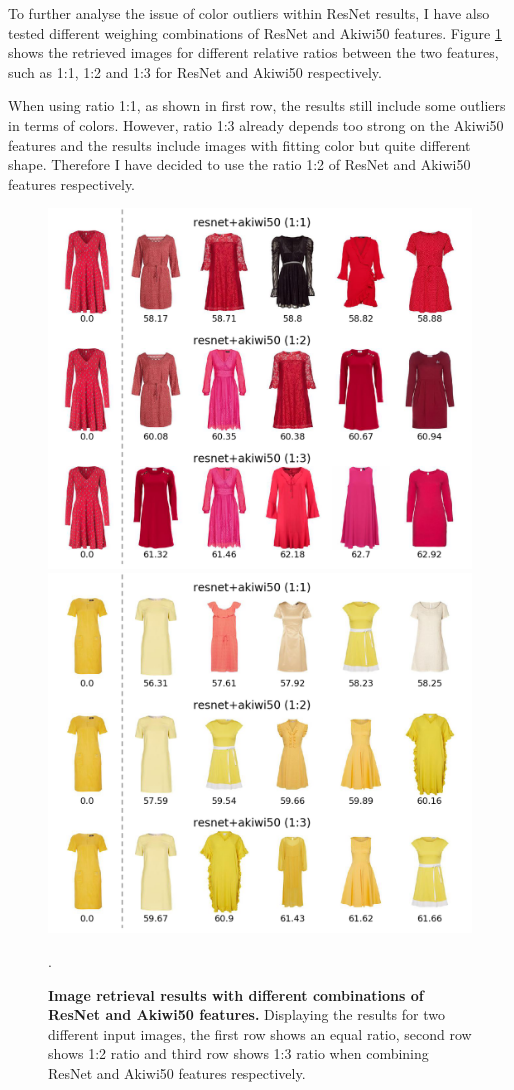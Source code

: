 \documentclass[12pt]{report}
\begin{document}
To further analyse the issue of color outliers within ResNet results, I have also tested different weighing combinations of ResNet and Akiwi50 features. Figure \ref{fig:search_weights} shows the retrieved images for different relative ratios between the two features, such as 1:1, 1:2 and 1:3 for ResNet and Akiwi50 respectively. 

When using ratio 1:1, as shown in first row, the results still include some outliers in terms of colors. However, ratio 1:3 already depends too strong on the Akiwi50 features and the results include images with fitting color but quite different shape. Therefore I have decided to use the ratio 1:2 of ResNet and Akiwi50 features respectively.

\begin{figure}[!h]
\centering
{\includegraphics[width=.48\linewidth]{04_experiments/retrieval/resnet_red}}\hspace{0.2cm}
{\includegraphics[width=.48\linewidth]{04_experiments/retrieval/resnet_yellow}}
\caption{\label{fig:search_weights} \textbf{Image retrieval results with different combinations of ResNet and Akiwi50 features.} Displaying the results for two different input images, the first row shows an equal ratio, second row shows 1:2 ratio and third row shows 1:3 ratio when combining ResNet and Akiwi50 features respectively.}.
\end{figure}
\end{document}
